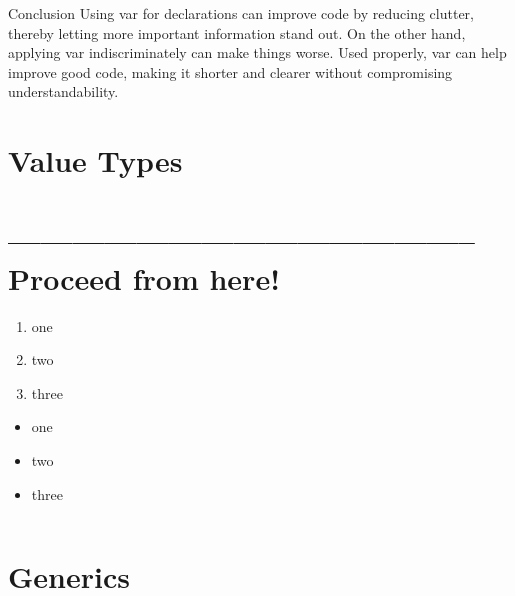 \documentclass[11pt,a4paper, titlepage, parskip=half, headsepline, footsepline, cleardoublepage=current, headheight=1cm]{scrbook}
\begin{document}
Conclusion
Using var for declarations can improve code by reducing clutter, thereby letting more important information stand out. On the other hand, applying var indiscriminately can make things worse. Used properly, var can help improve good code, making it shorter and clearer without compromising understandability.


\section{Value Types}\label{sec:ValueTypes}

\hrulefill\newpage 
\section{-------------------------------------------- Proceed from here!}
\lipsum[1]

\begin{enumerate}[label=P\arabic*.]
\item{one}
\item{two}
\item{three}
\end{enumerate}

\begin{itemize}[nosep]
\item{one}
\item{two}
\item{three}
\end{itemize}

\begin{lstlisting}[numbers=left]
\end{lstlisting}


\section{Generics}\label{sec:GenericTypes}

\hrulefill\newpage 
\end{document}
